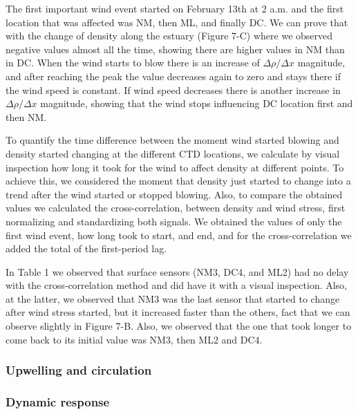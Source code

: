 \documentclass[11pt,letterpaper]{article}
\begin{document}
The first important wind event started on February 13th at 2 a.m. and the first location that was affected was NM, then ML, and finally DC. We can prove that with the change of density along the estuary (Figure 7-C) where we observed negative values almost all the time, showing there are higher values in NM than in DC. When the wind starts to blow there is an increase of $\Delta \rho/\Delta x$ magnitude, and after reaching the peak the value decreases again to zero and stays there if the wind speed is constant. If wind speed decreases there is another increase in $\Delta \rho/\Delta x$ magnitude, showing that the wind stops influencing DC location first and then NM.


To quantify the time difference between the moment wind started blowing and density started changing at the different CTD locations, we calculate by visual inspection how long it took for the wind to affect density at different points. To achieve this, we considered the moment that density just started to change into a trend after the wind started or stopped blowing. Also, to compare the obtained values we calculated the cross-correlation, between density and wind stress, first normalizing and standardizing both signals. We obtained the values of only the first wind event, how long took to start, and end, and for the cross-correlation we added the total of the first-period lag.

In Table 1 we observed that surface sensors (NM3, DC4, and ML2) had no delay with the cross-correlation method and did have it with a visual inspection. Also, at the latter, we observed that NM3 was the last sensor that started to change after wind stress started, but it increased faster than the others, fact that we can observe slightly in Figure 7-B. Also, we observed that the one that took longer to come back to its initial value was NM3, then ML2 and DC4.

\subsubsection{Upwelling and circulation}

\subsubsection{Dynamic response}
\end{document}
